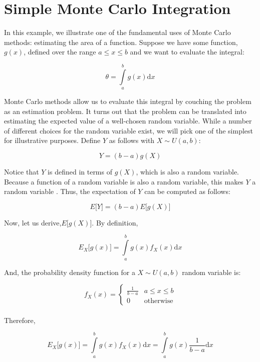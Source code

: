 \documentclass[
]{book}
\theoremstyle{definition}
\theoremstyle{definition}
\theoremstyle{definition}
\theoremstyle{definition}
\theoremstyle{remark}
\begin{document}
\hypertarget{ssMC}{%
\section{Simple Monte Carlo Integration}\label{ssMC}}

In this example, we illustrate one of the fundamental uses of Monte
Carlo methods: estimating the area of a function. Suppose we have some
function, \(g(x)\), defined over the range \(a \leq x \leq b\) and we want
to evaluate the integral:

\[ \theta = \int\limits_{a}^{b} g(x) \mathrm{d}x\]

Monte Carlo methods allow us to evaluate this integral by couching the
problem as an estimation problem. It turns out that the problem can be
translated into estimating the expected value of a well-chosen random
variable. While a number of different choices for the random variable
exist, we will pick one of the simplest for illustrative purposes.
Define \(Y\) as follows with \(X \sim U(a,b)\):

\begin{equation}
Y = \left(b-a\right)g(X)
\label{eq:ch3Y}
\end{equation}

Notice that \(Y\) is defined in terms of \(g(X)\), which is also a random
variable. Because a function of a random variable is also a random
variable, this makes \(Y\) a random variable . Thus, the expectation of
\(Y\) can be computed as follows:

\begin{equation}
E\lbrack Y \rbrack = \left(b-a\right)E\lbrack g(X)\rbrack
\label{eq:mcEY}
\end{equation}

Now, let us derive,\(E\lbrack g(X) \rbrack\). By definition,

\[ E_{X}\lbrack g(x) \rbrack = \int\limits_{a}^{b} g(x)f_{X}(x)\mathrm{d}x\]

And, the probability density function for a \(X \sim U(a,b)\) random
variable is:

\[f_{X}(x) =
\begin{cases}
\frac{1}{b-a} & a \leq x \leq b\\
0   & \text{otherwise}
\end{cases}\]\\
Therefore,

\begin{equation}
E_{X}\lbrack g(x) \rbrack  = \int\limits_{a}^{b} g(x)f_{X}(x)\mathrm{d}x = \int\limits_{a}^{b} g(x)\frac{1}{b-a}\mathrm{d}x
\end{equation}
\end{document}
